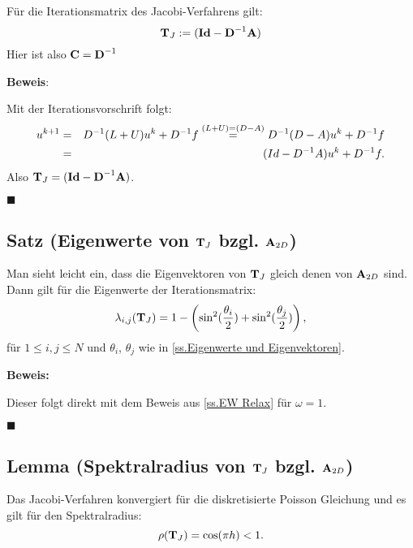 Für die Iterationsmatrix des Jacobi-Verfahrens gilt:
\begin{equation}
{\textbf{T}}_{J} := ({\textbf{Id}} - {\textbf{D}}^{-1} {\textbf{A}})
\end{equation}
Hier ist also ${\textbf{C}} = {\textbf{D}}^{-1}$

\textbf{Beweis}:

Mit der Iterationsvorschrift folgt:
\begin{eqnarray}
u^{k+1} &=& D^{-1}(L+U)u^{k} + D^{-1}f \overset{(L+U)=(D-A)}{=} D^{-1}(D-A)u^{k}+D^{-1}f \notag \\
&=& (Id-D^{-1}A)u^{k} + D^{-1}f. \notag
\end{eqnarray}
Also ${\textbf{T}}_{J} = ({\textbf{Id}} - {\textbf{D}}^{-1} {\textbf{A}})$.
\begin{flushright}
$\blacksquare$
\end{flushright}

\subsection{Satz (Eigenwerte von ${\textbf{T}}_{J}$ bzgl. ${\textbf{A}}_{2D}$)}\label{ss.EW Jacobi}

Man sieht leicht ein, dass die Eigenvektoren von ${\textbf{T}}_{J}$ gleich denen von ${\textbf{A}}_{2D}$ sind. Dann gilt für die Eigenwerte der Iterationsmatrix:
\begin{equation}
\lambda_{i,j}({\textbf{T}}_{J}) = 1 - \left(\sin^{2}(\frac {\theta_{i}} {2}) + \sin^{2}(\frac {\theta_{j}} {2}) \right), \label{eq.Jacobi-Eigenwerte}
\end{equation}
für $1 \le i,j \le N$ und $\theta_{i}$, $\theta_{j}$ wie in \autoref{ss.Eigenwerte und Eigenvektoren}.

\textbf{Beweis:}\label{b.EW Jacobi}

Dieser folgt direkt mit dem Beweis aus \autoref{ss.EW Relax} für $\omega = 1$.
\begin{flushright}
$\blacksquare$
\end{flushright}

\subsection{Lemma (Spektralradius von ${\textbf{T}}_{J}$ bzgl. ${\textbf{A}}_{2D}$)}\label{ss.Spektralradius Jacobi}

Das Jacobi-Verfahren konvergiert für die diskretisierte Poisson Gleichung und es gilt für den Spektralradius:
\begin{equation}
\rho({\textbf{T}}_{J}) = \cos(\pi h) < 1.
\end{equation}

